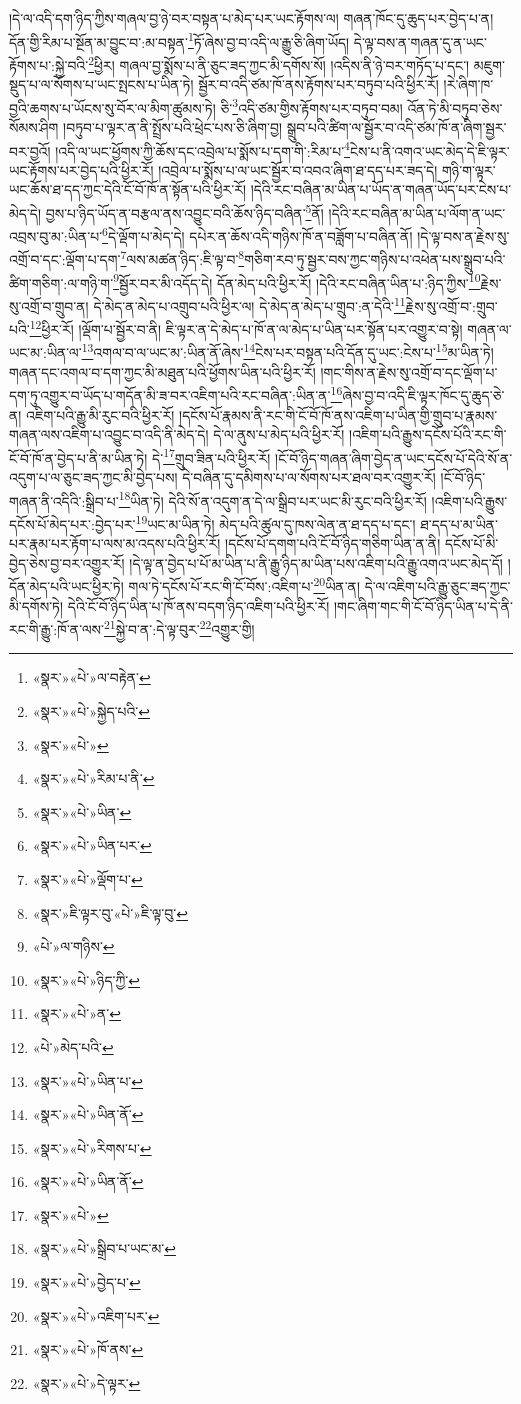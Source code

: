 །དེ་ལ་འདི་དག་ཉིད་ཀྱིས་གཞལ་བྱ་ཉེ་བར་བསྟན་པ་མེད་པར་ཡང་རྟོགས་ལ། གཞན་ཁོང་དུ་ཆུད་པར་བྱེད་པ་ན། དོན་གྱི་རིམ་པ་སྔོན་མ་བྱུང་བ་:མ་བསྟན་\footnote{«སྣར་»«པེ་»ལ་བརྟེན་}ཏོ་ཞེས་བྱ་བ་འདི་ལ་རྒྱུ་ཅི་ཞིག་ཡོད། དེ་ལྟ་བས་ན་གཞན་དུ་ན་ཡང་རྟོགས་པ་:སྐྱེ་བའི་\footnote{«སྣར་»«པེ་»སྐྱེད་པའི་}ཕྱིར། གཞལ་བྱ་སྨོས་པ་ནི་ཅུང་ཟད་ཀྱང་མི་དགོས་སོ། །འདིས་ནི་ཉེ་བར་གཏོད་པ་དང་། མཇུག་སྡུད་པ་ལ་སོགས་པ་ཡང་སྤངས་པ་ཡིན་ཏེ། སྦྱོར་བ་འདི་ཙམ་ཁོ་ནས་རྟོགས་པར་བཏུབ་པའི་ཕྱིར་རོ། །རེ་ཞིག་ཁ་བྱའི་ཆགས་པ་ཡོངས་སུ་བོར་ལ་མིག་ཚུམས་ཏེ། ཅི་\footnote{«སྣར་»«པེ་»}འདི་ཙམ་གྱིས་རྟོགས་པར་བཏུབ་བམ། འོན་ཏེ་མི་བཏུབ་ཅེས་སོམས་ཤིག །བཏུབ་པ་ལྟར་ན་ནི་སྤྲོས་པའི་ཕྲེང་པས་ཅི་ཞིག་བྱ། སྒྲུབ་པའི་ཚིག་ལ་སྦྱོར་བ་འདི་ཙམ་ཁོ་ན་ཞིག་སྦྱར་བར་བྱའོ། །འདི་ལ་ཡང་ཕྱོགས་ཀྱི་ཆོས་དང་འབྲེལ་པ་སྨོས་པ་དག་གི་:རིམ་པ་\footnote{«སྣར་»«པེ་»རིམ་པ་ནི་}ངེས་པ་ནི་འགའ་ཡང་མེད་དེ་ཇི་ལྟར་ཡང་རྟོགས་པར་བྱེད་པའི་ཕྱིར་རོ། །འབྲེལ་པ་སྨོས་པ་ལ་ཡང་སྦྱོར་བ་འབའ་ཞིག་ཐ་དད་པར་ཟད་དེ། གཉི་ག་ལྟར་ཡང་ཆོས་ཐ་དད་ཀྱང་དེའི་ངོ་བོ་ཁོ་ན་སྟོན་པའི་ཕྱིར་རོ། །དེའི་རང་བཞིན་མ་ཡིན་པ་ཡོད་ན་གཞན་ཡོད་པར་ངེས་པ་མེད་དེ། བྱས་པ་ཉིད་ཡོད་ན་བརྩལ་ནས་འབྱུང་བའི་ཆོས་ཉིད་བཞིན་\footnote{«སྣར་»«པེ་»ཡིན་}ནོ། །དེའི་རང་བཞིན་མ་ཡིན་པ་ལོག་ན་ཡང་འབྲས་བུ་མ་:ཡིན་པ་\footnote{«སྣར་»«པེ་»ཡིན་པར་}དེ་ལྡོག་པ་མེད་དེ། དཔེར་ན་ཆོས་འདི་གཉིས་ཁོ་ན་བཟློག་པ་བཞིན་ནོ། །དེ་ལྟ་བས་ན་རྗེས་སུ་འགྲོ་བ་དང་:ལྡོག་པ་དག་\footnote{«སྣར་»«པེ་»ལྡོག་པ་}ལས་མཚན་ཉིད་:ཇི་ལྟ་བ་\footnote{«སྣར་»ཇི་ལྟར་བུ་«པེ་»ཇི་ལྟ་བུ་}གཅིག་རབ་ཏུ་སྦྱར་བས་ཀྱང་གཉིས་པ་འཕེན་པས་སྒྲུབ་པའི་ཚིག་གཅིག་:ལ་གཉི་ག་\footnote{«པེ་»ལ་གཉིས་}སྦྱོར་བར་མི་འདོད་དེ། དོན་མེད་པའི་ཕྱིར་རོ། །དེའི་རང་བཞིན་ཡིན་པ་:ཉིད་ཀྱིས་\footnote{«སྣར་»«པེ་»ཉིད་ཀྱི་}རྗེས་སུ་འགྲོ་བ་གྲུབ་ན། དེ་མེད་ན་མེད་པ་འགྲུབ་པའི་ཕྱིར་ལ། དེ་མེད་ན་མེད་པ་གྲུབ་:ན་དེའི་\footnote{«སྣར་»«པེ་»ན་}རྗེས་སུ་འགྲོ་བ་:གྲུབ་པའི་\footnote{«པེ་»མེད་པའི་}ཕྱིར་རོ། །ལྡོག་པ་སྦྱོར་བ་ནི། ཇི་ལྟར་ན་དེ་མེད་པ་ཁོ་ན་ལ་མེད་པ་ཡིན་པར་སྟོན་པར་འགྱུར་བ་སྟེ། གཞན་ལ་ཡང་མ་:ཡིན་ལ་\footnote{«སྣར་»«པེ་»ཡིན་པ་}འགལ་བ་ལ་ཡང་མ་:ཡིན་ནོ་ཞེས་\footnote{«སྣར་»«པེ་»ཡིན་ནོ་}ངེས་པར་བསྟན་པའི་དོན་དུ་ཡང་:ངེས་པ་\footnote{«སྣར་»«པེ་»རིགས་པ་}མ་ཡིན་ཏེ། གཞན་དང་འགལ་བ་དག་ཀྱང་མི་མཐུན་པའི་ཕྱོགས་ཡིན་པའི་ཕྱིར་རོ། །གང་གིས་ན་རྗེས་སུ་འགྲོ་བ་དང་ལྡོག་པ་དག་ཏུ་འགྱུར་བ་ཡོད་པ་གདོན་མི་ཟ་བར་འཇིག་པའི་རང་བཞིན་:ཡིན་ན་\footnote{«སྣར་»«པེ་»ཡིན་ནོ་}ཞེས་བྱ་བ་འདི་ཇི་ལྟར་ཁོང་དུ་ཆུད་ཅེ་ན། འཇིག་པའི་རྒྱུ་མི་རུང་བའི་ཕྱིར་རོ། །དངོས་པོ་རྣམས་ནི་རང་གི་ངོ་བོ་ཁོ་ནས་འཇིག་པ་ཡིན་གྱི་གྲུབ་པ་རྣམས་གཞན་ལས་འཇིག་པ་འབྱུང་བ་འདི་ནི་མེད་དེ། དེ་ལ་ནུས་པ་མེད་པའི་ཕྱིར་རོ། །འཇིག་པའི་རྒྱུས་དངོས་པོའི་རང་གི་ངོ་བོ་ཁོ་ན་བྱེད་པ་ནི་མ་ཡིན་ཏེ། དེ་\footnote{«སྣར་»«པེ་»}གྲུབ་ཟིན་པའི་ཕྱིར་རོ། །ངོ་བོ་ཉིད་གཞན་ཞིག་བྱེད་ན་ཡང་དངོས་པོ་དེའི་སོ་ན་འདུག་པ་ལ་ཅུང་ཟད་ཀྱང་མི་བྱེད་པས། དེ་བཞིན་དུ་དམིགས་པ་ལ་སོགས་པར་ཐལ་བར་འགྱུར་རོ། །ངོ་བོ་ཉིད་གཞན་ནི་འདིའི་:སྒྲིབ་པ་\footnote{«སྣར་»«པེ་»སྒྲིབ་པ་ཡང་མ་}ཡིན་ཏེ། དེའི་སོ་ན་འདུག་ན་དེ་ལ་སྒྲིབ་པར་ཡང་མི་རུང་བའི་ཕྱིར་རོ། །འཇིག་པའི་རྒྱུས་དངོས་པོ་མེད་པར་:བྱེད་པར་\footnote{«སྣར་»«པེ་»བྱེད་པ་}ཡང་མ་ཡིན་ཏེ། མེད་པའི་ཚུལ་དུ་ཁས་ལེན་ན་ཐ་དད་པ་དང་། ཐ་དད་པ་མ་ཡིན་པར་རྣམ་པར་རྟོག་པ་ལས་མ་འདས་པའི་ཕྱིར་རོ། །དངོས་པོ་དགག་པའི་ངོ་བོ་ཉིད་གཅིག་ཡིན་ན་ནི། དངོས་པོ་མི་བྱེད་ཅེས་བྱ་བར་འགྱུར་རོ། །དེ་ལྟ་ན་བྱེད་པ་པོ་མ་ཡིན་པ་ནི་རྒྱུ་ཉིད་མ་ཡིན་པས་འཇིག་པའི་རྒྱུ་འགའ་ཡང་མེད་དོ། །དོན་མེད་པའི་ཡང་ཕྱིར་ཏེ། གལ་ཏེ་དངོས་པོ་རང་གི་ངོ་བོས་:འཇིག་པ་\footnote{«སྣར་»«པེ་»འཇིག་པར་}ཡིན་ན། དེ་ལ་འཇིག་པའི་རྒྱུ་ཅུང་ཟད་ཀྱང་མི་དགོས་ཏེ། དེའི་ངོ་བོ་ཉིད་ཡིན་པ་ཁོ་ནས་བདག་ཉིད་འཇིག་པའི་ཕྱིར་རོ། །གང་ཞིག་གང་གི་ངོ་བོ་ཉིད་ཡིན་པ་དེ་ནི་རང་གི་རྒྱུ་:ཁོ་ན་ལས་\footnote{«སྣར་»«པེ་»ཁོ་ནས་}སྐྱེ་བ་ན་:དེ་ལྟ་བུར་\footnote{«སྣར་»«པེ་»དེ་ལྟར་}འགྱུར་གྱི། 